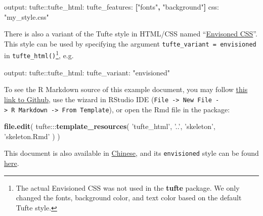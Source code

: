 \documentclass[]{tufte-handout}
\newenvironment{Shaded}{}{}
\newcommand{\AttributeTok}[1]{\textcolor[rgb]{0.49,0.56,0.16}{#1}}
\newcommand{\FunctionTok}[1]{\textcolor[rgb]{0.02,0.16,0.49}{#1}}
\newcommand{\KeywordTok}[1]{\textcolor[rgb]{0.00,0.44,0.13}{\textbf{#1}}}
\newcommand{\NormalTok}[1]{#1}
\newcommand{\OperatorTok}[1]{\textcolor[rgb]{0.40,0.40,0.40}{#1}}
\newcommand{\StringTok}[1]{\textcolor[rgb]{0.25,0.44,0.63}{#1}}
\begin{document}
\begin{Shaded}
\begin{Highlighting}[]
\FunctionTok{output:}
  \FunctionTok{tufte:}\AttributeTok{:tufte_html:}
    \FunctionTok{tufte_features:}\AttributeTok{ }\KeywordTok{[}\StringTok{"fonts"}\KeywordTok{,} \StringTok{"background"}\KeywordTok{]}
    \FunctionTok{css:}\AttributeTok{ }\StringTok{"my_style.css"}
\end{Highlighting}
\end{Shaded}

There is also a variant of the Tufte style in HTML/CSS named
``\href{http://nogginfuel.com/envisioned-css/}{Envisoned CSS}''. This
style can be used by specifying the argument
\texttt{tufte\_variant\ =\ \textquotesingle{}envisioned\textquotesingle{}}
in \texttt{tufte\_html()}\footnote{The actual Envisioned CSS was not
  used in the \textbf{tufte} package. We only changed the fonts,
  background color, and text color based on the default Tufte style.},
e.g.

\begin{Shaded}
\begin{Highlighting}[]
\FunctionTok{output:}
  \FunctionTok{tufte:}\AttributeTok{:tufte_html:}
    \FunctionTok{tufte_variant:}\AttributeTok{ }\StringTok{"envisioned"}
\end{Highlighting}
\end{Shaded}

To see the R Markdown source of this example document, you may follow
\href{https://github.com/rstudio/tufte/raw/master/inst/rmarkdown/templates/tufte_html/skeleton/skeleton.Rmd}{this
link to Github}, use the wizard in RStudio IDE
(\texttt{File\ -\textgreater{}\ New\ File\ -\textgreater{}\ R\ Markdown\ -\textgreater{}\ From\ Template}),
or open the Rmd file in the package:

\begin{Shaded}
\begin{Highlighting}[]
\KeywordTok{file.edit}\NormalTok{(}
\NormalTok{  tufte}\OperatorTok{:::}\KeywordTok{template_resources}\NormalTok{(}
    \StringTok{'tufte_html'}\NormalTok{, }\StringTok{'..'}\NormalTok{, }\StringTok{'skeleton'}\NormalTok{, }\StringTok{'skeleton.Rmd'}
\NormalTok{  )}
\NormalTok{)}
\end{Highlighting}
\end{Shaded}

This document is also available in
\href{http://rstudio.github.io/tufte/cn/}{Chinese}, and its
\texttt{envisioned} style can be found
\href{http://rstudio.github.io/tufte/envisioned/}{here}.


\end{document}
